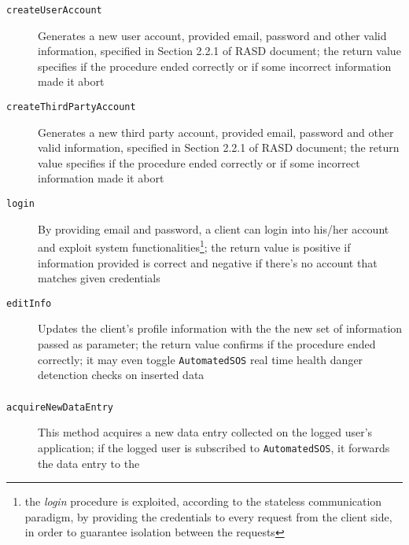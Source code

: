 \documentclass[../DD0.tex]{subfiles}
\begin{document}
      \begin{description}
        \item[\texttt{createUserAccount}] Generates a new user account, provided email, password and other valid information, specified in Section 2.2.1 of RASD document; the return value specifies if the procedure ended correctly or if some incorrect information made it abort
        \item[\texttt{createThirdPartyAccount}] Generates a new third party account, provided email, password and other valid information, specified in Section 2.2.1 of RASD document; the return value specifies if the procedure ended correctly or if some incorrect information made it abort
        \item[\texttt{login}] By providing email and password, a client can login into his/her account and exploit system functionalities\footnote{the \textit{login} procedure is exploited, according to the stateless communication paradigm, by providing the credentials to every request from the client side, in order to guarantee isolation between the requests}; the return value is positive if information provided is correct and negative if there's no account that matches given credentials
        \item[\texttt{editInfo}] Updates the client's profile information with the the new set of information passed as parameter; the return value confirms if the procedure ended correctly; it may even toggle \texttt{AutomatedSOS} real time health danger detenction checks on inserted data
      \end{description}

    \subsubsection{\DataCollector}
    \label{sec:datacollectormethod}
      \begin{description}
        \item[\texttt{acquireNewDataEntry}] This method acquires a new data entry collected on the logged user's application; if the logged user is subscribed to \texttt{AutomatedSOS}, it forwards the data entry to the \EmergencyDetector
      \end{description}
\end{document}
